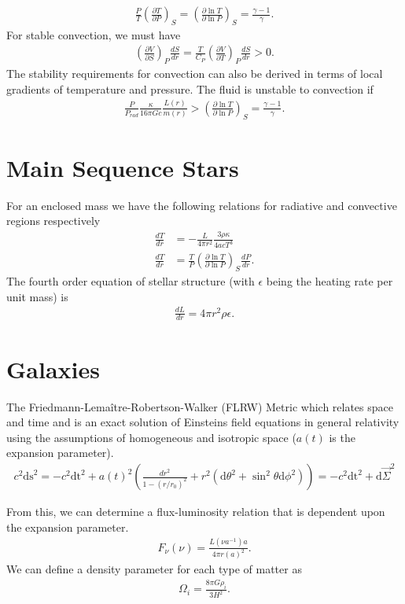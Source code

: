 \begin{multicols}{2}
\begin{align}
\frac{P}{T}\left(\frac{\partial T}{\partial P}\right)_S = \left(\frac{\partial \ln T}{\partial \ln P}\right)_S = \frac{\gamma -1}{\gamma}.
\end{align}
For stable convection, we must have
\begin{align}
\left(\frac{\partial V}{\partial S}\right)_P\frac{dS}{dr} = \frac{T}{C_P}\left(\frac{\partial V}{\partial T}\right)_P\frac{dS}{dr} > 0.
\end{align}
The stability requirements for convection can also be derived in terms of local gradients of temperature and pressure. The fluid is unstable to convection if
\begin{align}
\frac{P}{P_{rad}}\frac{\kappa}{16\pi Gc}\frac{L(r)}{m(r)} > \left(\frac{\partial \ln T}{\partial \ln P}\right)_S = \frac{\gamma-1}{\gamma}.
\end{align}
\section{Main Sequence Stars}
For an enclosed mass we have the following relations for radiative and convective regions respectively
\begin{align}
	\frac{dT}{dr} &= -\frac{L}{4\pi r^2}\frac{3\rho \kappa}{4acT^3} \\
	\frac{dT}{dr} &= \frac{T}{P}\left(\frac{\partial \ln T}{\partial \ln P}\right)_S \frac{dP}{dr}.
\end{align}
The fourth order equation of stellar structure  (with $\epsilon$ being the heating rate per unit mass) is
\begin{align}
	\frac{dL}{dr} = 4\pi r^2\rho \epsilon.
\end{align}
\end{multicols}

\newpage

\section{Galaxies}

The Friedmann-Lema\^{i}tre-Robertson-Walker (FLRW) Metric which relates space and time and is an exact solution of Einsteins field equations in general relativity using the assumptions of homogeneous and isotropic space ($a(t)$ is the expansion parameter).
\begin{align}
	c^2 \textrm{ds}^2=-c^2\textrm{dt}^2+a(t)^2\left(\frac{dr^2}{1-(r/r_0)^2}+r^2(\textrm{d}\theta^2+\sin^2\theta \textrm{d}\phi^2) \right) = -c^2\textrm{dt}^2+\textrm{d}\vec{\Sigma}^2
\end{align}
\begin{multicols}{2}
From this, we can determine a flux-luminosity relation that is dependent upon the expansion parameter.
\begin{align}
	F_\nu(\nu)=\frac{L(\nu a^{-1})a}{4\pi r(a)^2}.
\end{align}
We can define a density parameter for each type of matter as
\begin{align}
	\Omega_i = \frac{8\pi G \rho_i}{3H^2}.
\end{align}
\end{multicols}



